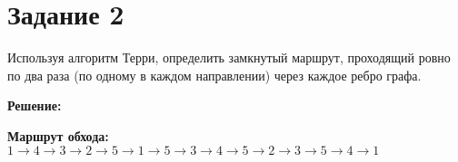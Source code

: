 \section*{Задание 2}

Используя алгоритм Терри, определить замкнутый маршрут, проходящий ровно по два раза (по одному в каждом направлении) через каждое ребро графа.

\begin{center}
\end{center}

\vspace{\baselineskip}

{\large\textbf{Решение:}}

\vspace{\baselineskip}

\begin{center}
\end{center}

\textbf{Маршрут обхода:} $1\rightarrow4\rightarrow3\rightarrow2\rightarrow5\rightarrow1\rightarrow5\rightarrow3\rightarrow4\rightarrow5\rightarrow2\rightarrow3\rightarrow5\rightarrow4\rightarrow1$

\newpage